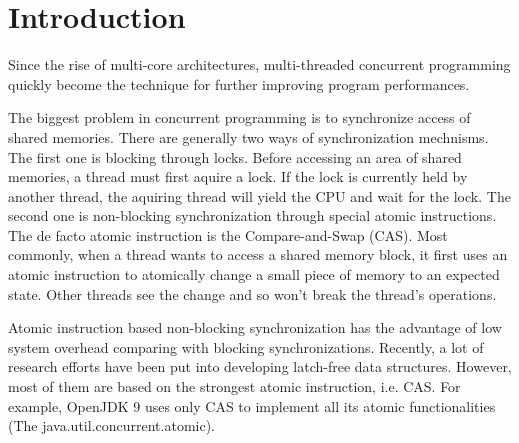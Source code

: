 \documentclass{sig-alternate}
\begin{document}
%
\author{
%
%
\alignauthor
Shengliang Xu\\
}
\maketitle


\section{Introduction}

Since the rise of multi-core architectures, multi-threaded concurrent
programming quickly become the technique for further improving program
performances. 

The biggest problem in concurrent programming is to synchronize access
of shared memories. There are generally two ways of synchronization
mechnisms. The first one is blocking through locks. Before accessing
an area of shared memories, a thread must first aquire a lock. If the
lock is currently held by another thread, the aquiring thread will
yield the CPU and wait for the lock.  The second one is non-blocking
synchronization through special atomic instructions. The de facto
atomic instruction is the Compare-and-Swap (CAS). Most commonly, when
a thread wants to access a shared memory block, it first uses an
atomic instruction to atomically change a small piece of memory to an
expected state. Other threads see the change and so won't break the
thread's operations.

Atomic instruction based non-blocking synchronization has the
advantage of low system overhead comparing with blocking
synchronizations. Recently, a lot of research efforts have been put
into developing latch-free data structures. However, most of them are
based on the strongest atomic instruction, i.e. CAS. For example,
OpenJDK 9 uses only CAS to implement all its atomic functionalities
(The java.util.concurrent.atomic).
\end{document}

